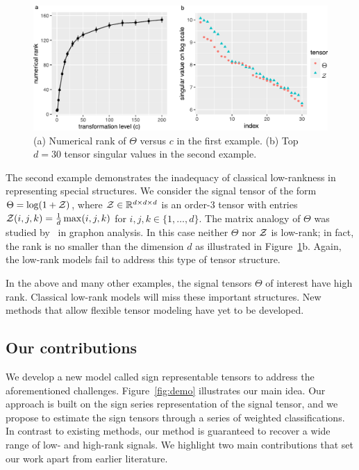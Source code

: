 \documentclass[useAMS,usenatbib,usegraphicx,referee]{biom}
\theoremstyle{plain}
\theoremstyle{definition}
\begin{document}
\begin{figure}[h]
\centering
\includegraphics[width=.8\textwidth]{figure/example_comb.pdf}
 \captionsetup{justification=raggedright,font=small}
  \captionsetup{justification=raggedright,font=small}
\caption{(a) Numerical rank of $\Theta$ versus $c$ in the first example. (b) Top $d=30$ tensor singular values in the second example. }\label{fig:example}
\end{figure}
\vspace{-.7cm}

The second example demonstrates the inadequacy of classical low-rankness in representing special structures.  We consider the signal tensor of the form $\Theta=\log(1+\mathcal{Z})$, where $\mathcal{Z}\in\mathbb{R}^{d\times d\times d}$ is an order-3 tensor with entries $\mathcal{Z}(i,j,k)={1\over d}\max(i,j,k)$ for $i,j,k\in\{1,\ldots,d\}$. The matrix analogy of $\Theta$ was studied by~\cite{chan2014consistent} in graphon analysis. In this case neither $\Theta$ nor $\mathcal{Z}$ is low-rank; in fact, the rank is no smaller than the dimension $d$ as illustrated in Figure~\ref{fig:example}b. Again,  the  low-rank models fail to address this type of tensor structure. 

In the above and many other examples, the signal tensors $\Theta$ of interest have high rank. Classical low-rank models will miss these important structures. New methods that allow flexible tensor modeling have yet to be developed. 


\subsection{Our contributions}
We develop a new model called sign representable tensors to address the aforementioned challenges. 
Figure~\ref{fig:demo} illustrates our main idea. Our approach is built on the sign series representation of the signal tensor, and we propose to estimate the sign tensors through a series of weighted classifications. In contrast to existing methods, our method is guaranteed to recover a wide range of low- and high-rank signals. We highlight two main contributions that set our work apart from earlier literature. 
\end{document}
